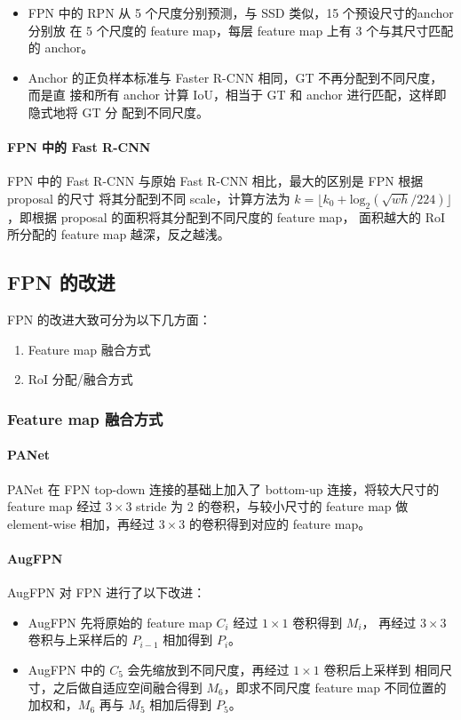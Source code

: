 \begin{itemize}
  \item FPN 中的 RPN 从 5 个尺度分别预测，与 SSD 类似，15 个预设尺寸的anchor 分别放
    在 5 个尺度的 feature map，每层 feature map 上有 3 个与其尺寸匹配的 anchor。
  \item Anchor 的正负样本标准与 Faster R-CNN 相同，GT 不再分配到不同尺度，而是直
    接和所有 anchor 计算 IoU，相当于 GT 和 anchor 进行匹配，这样即隐式地将 GT 分
    配到不同尺度。
\end{itemize}

\paragraph{FPN 中的 Fast R-CNN}

FPN 中的 Fast R-CNN 与原始 Fast R-CNN 相比，最大的区别是 FPN 根据 proposal 的尺寸
将其分配到不同 scale，计算方法为 $ k = \lfloor k_0 + \mathrm{log}_2 (
\sqrt{wh}/224 ) \rfloor$，即根据 proposal 的面积将其分配到不同尺度的 feature map，
面积越大的 RoI 所分配的 feature map 越深，反之越浅。

\subsection{FPN 的改进}
FPN 的改进大致可分为以下几方面：
\begin{enumerate}
  \item Feature map 融合方式
  \item RoI 分配/融合方式
\end{enumerate}

\subsubsection{Feature map 融合方式}
\paragraph{PANet}
PANet 在 FPN top-down 连接的基础上加入了 bottom-up 连接，将较大尺寸的 feature
map 经过 $3 \times 3$ stride 为 2 的卷积，与较小尺寸的 feature
map 做 element-wise 相加，再经过 $3 \times 3$ 的卷积得到对应的 feature
map\cite{2018-PANet}。

\paragraph{AugFPN}
AugFPN 对 FPN 进行了以下改进：
\begin{itemize}
  \item AugFPN 先将原始的 feature map $C_i$ 经过 $1 \times 1$ 卷积得到 $M_i$，
    再经过 $3 \times 3$ 卷积与上采样后的 $P_{i-1}$ 相加得到 $P_i$。
  \item AugFPN 中的 $C_5$ 会先缩放到不同尺度，再经过 $1 \times 1$ 卷积后上采样到
    相同尺寸，之后做自适应空间融合得到 $M_6$，即求不同尺度 feature map 不同位置的
    加权和，$M_6$ 再与 $M_5$ 相加后得到 $P_5$。
\end{itemize}

